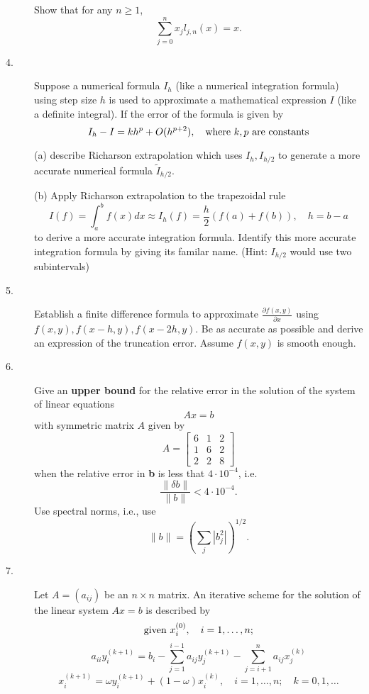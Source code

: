 \documentclass{article}
\begin{document}
\begin{description}
Show that for any $n \geq 1$,
$$\sum^n_{j=0} x_j l_{j,n} (x) = x.$$

\item[4.]
Suppose a numerical formula $I_h$ (like a numerical integration
formula) using step size
$h$ is used to approximate a mathematical expression $I$ (like a
definite integral). If the error of the formula is given by
$$I_h - I = kh^p + O(h^{p+2}), \quad \hbox{where\ } k,p
  \hbox{\ are\ } \hbox{constants}$$

\item[\quad] (a)
describe Richarson extrapolation which uses $I_h, I_{h/2}$ to generate a
more accurate numerical formula $\widetilde I_{h/2}$.

\item[\quad] (b)
Apply Richarson extrapolation to the trapezoidal rule
$$I(f) =\int^b_a f(x) dx \approx I_h (f) = \frac{h}{2} (f(a) + f(b)), \quad
  h=b-a$$
to derive a more accurate integration formula. Identify this more accurate
integration formula by giving its familar name.
(Hint: $I_{h/2}$ would use two subintervals)

\item[5.]
Establish a finite difference formula to approximate
$\frac{\partial f(x,y)}{\partial x}$ using $f(x,y), f(x-h,y), f(x-2h, y)$.
Be as accurate as possible and derive an expression of the truncation error.
Assume $f(x,y)$ is smooth enough.

\item[6.]
Give an {\bf upper bound} for the relative error in the solution of the
system of linear equations
$$Ax=b$$
with symmetric matrix $A$ given by
$$A= \begin{bmatrix}
        6&1&2 \\
        1&6&2 \\
        2&2&8
        \end{bmatrix}$$
when the relative error in {\bf b} is less that $4 \cdot 10^{-4}$, i.e.
$$\frac{\parallel \delta b \parallel}{\parallel b \parallel}
  < 4 \cdot 10^{-4}.$$
Use spectral norms, i.e., use
$$\parallel b \parallel = \left( \sum_j |b_j^2| \right)^{1/2}.$$

\item[7.]
Let $A = (a_{ij})$ be an $n \times n$ matrix. An iterative scheme for the
solution of the linear system $Ax = b$ is described by
$$\hbox{given\ } x_i^{(0)}, \quad i = 1, \dots, n;$$
$$a_{ii} y_i^{(k+1)} = b_i - \sum^{i-1}_{j=1} a_{ij}y_j^{(k+1)} -
  \sum^n_{j=i+1} a_{ij}x_j^{(k)}$$
$$x_i^{(k+1)} = \omega y_i^{(k+1)} + (1-\omega) x_i^{(k)}, \quad
  i=1, \dots, n; \quad k = 0,1, \dots $$


\end{description}
\end{document}
